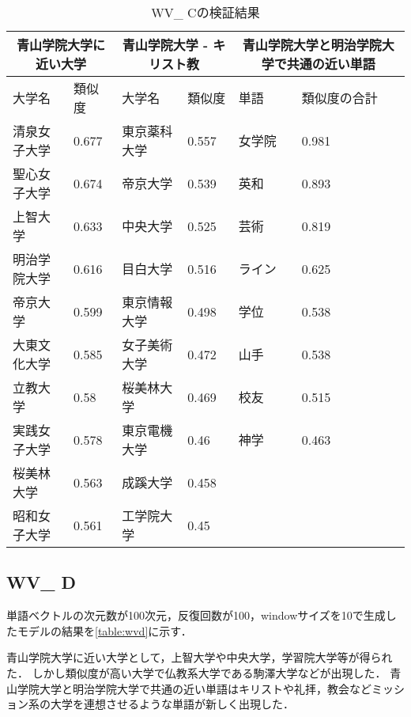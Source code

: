 \begin{table}[H]
\caption{WV\_ Cの検証結果}
\centering
\footnotesize
\begin{tabular}{ll|ll|ll}
\hline
\multicolumn{2}{c}{青山学院大学に近い大学} & \multicolumn{2}{c}{青山学院大学 - キリスト教} & \multicolumn{2}{c}{青山学院大学と明治学院大学で共通の近い単語}
\\ \hline
大学名 & 類似度 & 大学名 & 類似度 & 単語 & 類似度の合計
\\ \hline \hline
清泉女子大学 & 0.677 & 東京薬科大学 & 0.557 & 女学院 & 0.981\\
聖心女子大学 & 0.674 & 帝京大学 & 0.539 & 英和 & 0.893\\
上智大学 & 0.633 & 中央大学 & 0.525 & 芸術 & 0.819\\
明治学院大学 & 0.616 & 目白大学 & 0.516 & ライン & 0.625\\
帝京大学 & 0.599 & 東京情報大学 & 0.498 & 学位 & 0.538\\
大東文化大学 & 0.585 & 女子美術大学 & 0.472 & 山手 & 0.538\\
立教大学 & 0.58 & 桜美林大学 & 0.469 & 校友 & 0.515\\
実践女子大学 & 0.578 & 東京電機大学 & 0.46 & 神学 & 0.463\\
桜美林大学 & 0.563 & 成蹊大学 & 0.458 & & \\
昭和女子大学 & 0.561 & 工学院大学 & 0.45 & & \\ \hline
\end{tabular}
\label{table:wvc}
\end{table}


\subsection{WV\_ D}
単語ベクトルの次元数が100次元，反復回数が100，windowサイズを10で生成したモデルの結果を\ref{table:wvd}に示す．

青山学院大学に近い大学として，上智大学や中央大学，学習院大学等が得られた．
しかし類似度が高い大学で仏教系大学である駒澤大学などが出現した．
青山学院大学と明治学院大学で共通の近い単語はキリストや礼拝，教会などミッション系の大学を連想させるような単語が新しく出現した．


